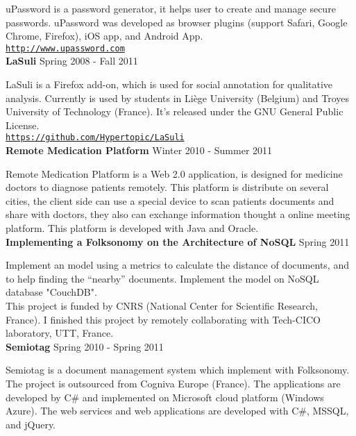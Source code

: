 \documentclass[10pt]{article}
\newcommand{\halfblankline}{\quad\vspace{-0.5\baselineskip}\pagebreak[3]}
\providecommand*\url[1]{\href{#1}{#1}}
\renewcommand*\url[1]{\href{#1}{\texttt{#1}}}
\begin{document}
uPassword is a password generator, it helps user to create and manage secure passwords. uPassword was developed as browser plugins (support Safari, Google Chrome, Firefox),  iOS app, and Android App. \\
\url{http://www.upassword.com} \\


\textbf{LaSuli}
\hfill Spring 2008 - Fall 2011

\halfblankline

LaSuli is a Firefox add-on, which is used for social annotation for qualitative analysis. Currently is used by students in Liège University (Belgium) and Troyes University of Technology (France). It's released under the GNU General Public License.\\
\url{https://github.com/Hypertopic/LaSuli}\\

\textbf{Remote Medication Platform}
\hfill Winter 2010 - Summer 2011

\halfblankline

Remote Medication Platform is a Web 2.0 application, is designed for medicine doctors to diagnose patients remotely. This platform is distribute on several cities, the client side can use a special device to scan patients documents and share with doctors, they also can exchange information thought a online meeting platform. This platform is developed with Java and Oracle.\\


\textbf{Implementing a Folksonomy on the Architecture of NoSQL}
\hfill Spring 2011

\halfblankline

Implement an model using a metrics to calculate the distance of documents, and to help finding the “nearby” documents. Implement the model on NoSQL database "CouchDB".\\
This project is funded by CNRS (National Center for Scientific Research, France). I finished this project by remotely collaborating with Tech-CICO laboratory, UTT, France. \\


\textbf{Semiotag}
\hfill Spring 2010 - Spring 2011

\halfblankline

Semiotag is a document management system which implement  with Folksonomy. The project is outsourced from Cogniva Europe (France). The applications are developed by C\# and implemented on Microsoft cloud platform (Windows Azure). The web services and web applications are developed with C\#, MSSQL, and jQuery.\\
\end{document}
